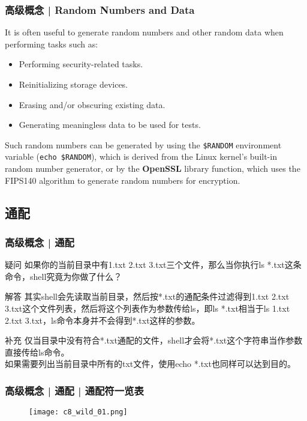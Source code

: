 \begin{frame}[fragile]
  \frametitle{高级概念 | Random Numbers and Data}
  It is often useful to generate random numbers and other random data when performing tasks such as:
  \begin{itemize}
    \item Performing security-related tasks.
    \item Reinitializing storage devices.
    \item Erasing and/or obscuring existing data.
    \item Generating meaningless data to be used for tests.
  \end{itemize}
  Such random numbers can be generated by using the \verb|$RANDOM| environment variable (\verb|echo $RANDOM|), which is derived from the Linux kernel's built-in random number generator, or by the \textbf{OpenSSL} library function, which uses the FIPS140 algorithm to generate random numbers for encryption.
\end{frame}

\subsection{通配}
\begin{frame}
  \frametitle{高级概念 | 通配}
  \begin{block}{疑问}
    如果你的当前目录中有1.txt 2.txt 3.txt三个文件，那么当你执行ls *.txt这条命令，shell究竟为你做了什么？
  \end{block}
  \pause
  \begin{block}{解答}
    其实shell会先读取当前目录，然后按*.txt的通配条件过滤得到1.txt 2.txt 3.txt这个文件列表，然后将这个列表作为参数传给ls，即ls *.txt相当于ls 1.txt 2.txt 3.txt，ls命令本身并不会得到*.txt这样的参数。
  \end{block}
  \pause
  \begin{block}{补充}
    仅当目录中没有符合*.txt通配的文件，shell才会将*.txt这个字符串当作参数直接传给ls命令。\\
    如果需要列出当前目录中所有的txt文件，使用echo *.txt也同样可以达到目的。
  \end{block}
\end{frame}

\begin{frame}
  \frametitle{高级概念 | 通配 | 通配符一览表}
  \begin{figure}
    \centering
    \texttt{[image: c8\_wild\_01.png]}
  \end{figure}
\end{frame}

